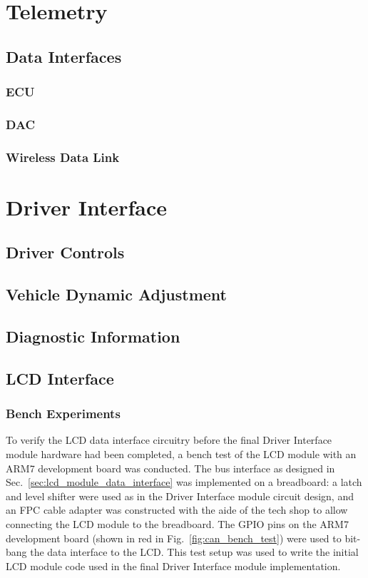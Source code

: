 \section{Telemetry}


\subsection{Data Interfaces}


\subsubsection{ECU }


\subsubsection{DAC }


\subsubsection{Wireless Data Link}


\section{Driver Interface}


\subsection{Driver Controls}


\subsection{Vehicle Dynamic Adjustment}


\subsection{Diagnostic Information}


\subsection{LCD Interface}

\subsubsection{Bench Experiments}

To verify the LCD data interface circuitry before the final Driver Interface module hardware had been completed, a bench test of the LCD module with an ARM7 development board was conducted. The bus interface as designed in Sec.\ \ref{sec:lcd_module_data_interface} was implemented on a breadboard: a latch and level shifter were used as in the Driver Interface module circuit design, and an FPC cable adapter was constructed with the aide of the tech shop to allow connecting the LCD module to the breadboard. The GPIO pins on the ARM7 development board (shown in red in Fig.\ \ref{fig:can_bench_test}) were used to bit-bang the data interface to the LCD. This test setup was used to write the initial LCD module code used in the final Driver Interface module implementation.

